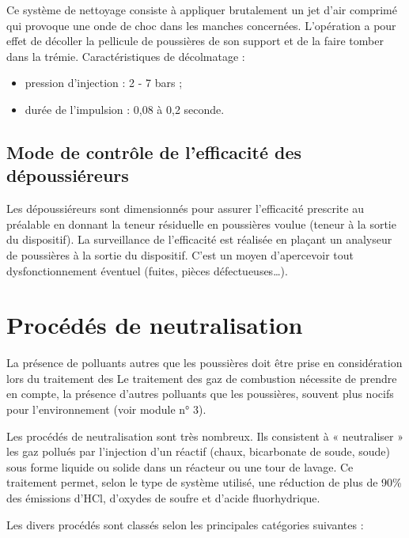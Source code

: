 \vspace{0.3cm}

Ce système de nettoyage consiste à appliquer brutalement un jet d’air comprimé qui provoque une onde de choc dans les manches concernées. L’opération a pour effet de décoller la pellicule de poussières de son support et de la faire tomber dans la trémie.
Caractéristiques de décolmatage :

\begin{itemize}
    \item pression d'injection : 2 - 7 bars ;
  \item durée de l'impulsion : 0,08 à 0,2 seconde.
\end{itemize}

\subsection{Mode de contrôle de l’efficacité des dépoussiéreurs} 

Les dépoussiéreurs sont dimensionnés pour assurer l’efficacité prescrite au préalable en donnant la teneur résiduelle en poussières voulue (teneur à la sortie du dispositif).
La surveillance de l’efficacité est réalisée en plaçant un analyseur de poussières à la sortie du dispositif. C’est un moyen d’apercevoir tout dysfonctionnement éventuel (fuites, pièces défectueuses…).


\section{Procédés de neutralisation}

La présence de polluants autres que les poussières doit être prise en considération lors du traitement des Le traitement des gaz de combustion nécessite de prendre en compte, la présence d’autres polluants que les poussières, souvent plus nocifs pour l’environnement (voir module n° 3).
\vspace{0.3cm}

Les procédés de neutralisation sont très nombreux. Ils consistent à « neutraliser » les gaz pollués par l’injection d’un réactif (chaux, bicarbonate de soude, soude) sous forme liquide ou solide dans un réacteur ou une tour de lavage. Ce traitement permet, selon le type de système utilisé, une réduction de plus de 90\% des émissions d’HCl, d’oxydes de soufre et d’acide fluorhydrique. 
\vspace{0.3cm}

Les divers procédés sont classés selon les principales catégories suivantes :


